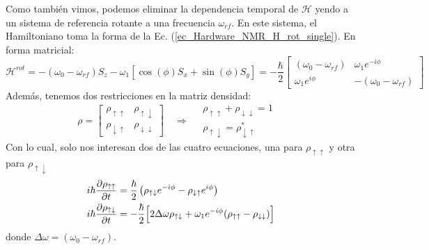 \documentclass[a4paper,11pt]{book} %
\numberwithin{equation}{chapter}
\def\lp{\left(}
\def\rp{\right)}
\def\lc{\left[}
\def\rc{\right]}
\def\Lc{\Bigl[}
\def\Rc{\Bigr]}
\def\rqa{\quad \Rightarrow \quad}
\begin{document}
Como también vimos, podemos eliminar la dependencia temporal de $\mathcal{H}$ yendo a un sistema de referencia rotante a una frecuencia $\omega_{rf}$. En este sistema, el Hamiltoniano toma la forma de la Ec. (\ref{ec_Hardware_NMR_H_rot_single}). En forma matricial:
	\begin{equation}
	\mathcal{H}^{rot} = - (\omega_0 - \omega_{rf}) S_z - \omega_1 \lc \cos (\phi) S_x + \sin (\phi) S_y \rc = 
	- \frac{\hbar}{2} \begin{bmatrix}
	(\omega_0 - \omega_{rf})  &  \omega_1 e^{-i \phi} \\
	\omega_1 e^{i \phi}          &  - (\omega_0 - \omega_{rf}) 
	\end{bmatrix}
	\end{equation}
Además, tenemos dos restricciones en la matriz densidad: 
	\begin{equation*}
	\rho = 
	\begin{bmatrix} 
		\rho_{\uparrow \uparrow} & \rho_{\uparrow \downarrow} \\   
		\rho_{\downarrow \uparrow} & \rho_{\downarrow \downarrow}
	\end{bmatrix} 
	\rqa
	\begin{matrix}
		\rho_{\uparrow \uparrow} + \rho_{\downarrow \downarrow}  = 1 &\\
		\rho_{\uparrow \downarrow}  = \rho^{*}_{\downarrow \uparrow} &
	\end{matrix}
	\end{equation*}
Con lo cual, solo nos interesan dos de las cuatro ecuaciones, una para $\rho_{\uparrow \uparrow}$ y otra para $\rho_{\uparrow \downarrow}$
	\begin{align}
	i \hbar \frac{\partial \rho_{\uparrow \uparrow}}{\partial t} & = \frac{\hbar}{2} \lp \rho_{\uparrow \downarrow} e^{-i \phi} - \rho_{\downarrow \uparrow} e^{i \phi} \rp \label{ec_decoherencia_rho_up-up}\\
	i \hbar \frac{\partial \rho_{\uparrow \downarrow}}{\partial t} & = 
	- \frac{\hbar}{2} \Lc 2 \Delta \omega \rho_{\uparrow \downarrow} + 
	\omega_1 e^{-i \phi} (\rho_{\uparrow \uparrow} - \rho_{\downarrow \downarrow}) \Rc \label{ec_decoherencia_rho_up-down}
	\end{align}
donde $\Delta \omega = (\omega_0 - \omega_{rf})$.
\end{document}
